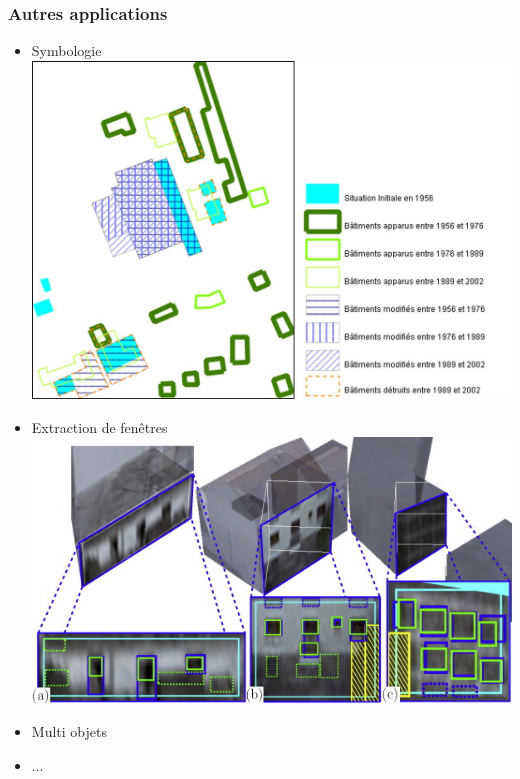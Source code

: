 \documentclass{beamer}
\begin{document}
\begin{frame}
\frametitle{Autres applications}
\begin{itemize}
\item Symbologie \hfill \includegraphics[width = 0.5\linewidth]{symbology}
\item Extraction de fenêtres \hfill \includegraphics[width = 0.5\linewidth]{jpb}
\item Multi objets
\item ...
\end{itemize}
\end{frame}
\end{document}
